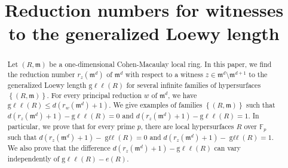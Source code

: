 \documentclass{amsart}
\theoremstyle{definition}
\theoremstyle{definition}
\numberwithin{equation}{section}
\theoremstyle{definition}
\DeclareMathOperator{\Gll}{g\ell\ell}
\begin{document}
\title{Reduction numbers for witnesses to the generalized Loewy length}
\begin{abstract}  
Let $(R,\mathfrak{m})$ be a one-dimensional Cohen-Macaulay local ring. In this paper, we find the reduction number $r_{z}(\mathfrak{m}^d)$ of $\mathfrak{m}^d$ with respect to a witness $z\in \mathfrak{m}^d \setminus \mathfrak{m}^{d+1}$ to the generalized Loewy length $\text{g}\ell\ell(R)$ for several infinite families of hypersurfaces $\left\{(R,\mathfrak{m}) \right\}$. For every principal reduction $w$ of $\mathfrak{m}^d$, we have $\text{g}\ell\ell(R) \leq d(r_{w}(\mathfrak{m}^d)+1)$. We give examples of families $\left\{ (R,\mathfrak{m}) \right\}$ such that $d(r_{z}(\mathfrak{m}^d)+1)-\text{g}\ell\ell(R)=0$ and $d(r_{z}(\mathfrak{m}^d)+1)-\text{g}\ell\ell(R)=1$. In particular, we prove that for every prime $p$, there are local hypersurfaces $R$ over $\mathbb{F}_p$ such that $d(r_{z}(\mathfrak{m}^d)+1)-\Gll(R)=0$ and $d(r_{z}(\mathfrak{m}^d)+1)-\Gll(R)=1.$ We also prove that the difference $d(r_{z}(\mathfrak{m}^d)+1)-\text{g}\ell\ell(R)$ can vary independently of $\text{g}\ell\ell(R)-e(R)$.
\end{abstract}
\maketitle
\end{document}
